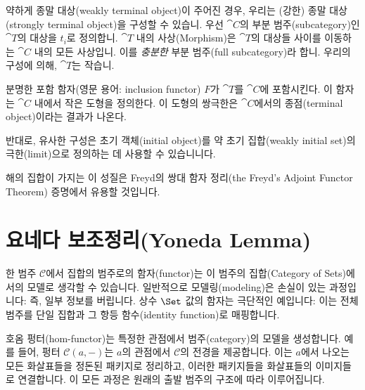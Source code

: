 \documentclass[DaoFP]{subfiles}
\begin{document}
약하게 종말 대상(weakly terminal object)이 주어진 경우, 우리는 (강한) 종말 대상(strongly terminal object)을 구성할 수 있습니. 우선 $\cat C$의 부분 범주(subcategory)인 $\cat T$의 대상을 $t_i$로 정의합니. $\cat T$ 내의 사상(Morphism)은 $\cat T$의 대상들 사이를 이동하는 $\cat C$ 내의 모든 사상입니. 이를 \emph{충분한} 부분 범주(full subcategory)라 합니. 우리의 구성에 의해, $\cat T$는 작습니.

분명한 포함 함자(영문 용어: inclusion functor) $F$가 $\cat T$를 $\cat C$에 포함시킨다. 이 함자는 $\cat C$ 내에서 작은 도형을 정의한다. 이 도형의 쌍극한은 $\cat C$에서의 종점(terminal object)이라는 결과가 나온다.

반대로, 유사한 구성은 초기 객체(initial object)를 약 초기 집합(weakly initial set)의 극한(limit)으로 정의하는 데 사용할 수 있습니니다.

해의 집합이 가지는 이 성질은 Freyd의 쌍대 함자 정리(the Freyd's Adjoint Functor Theorem) 증명에서 유용할 것입니다.

\section{요네다 보조정리(Yoneda Lemma)}

한 범주 $\mathcal{C}$에서 집합의 범주로의 함자(functor)는 이 범주의 집합(Category of Sets)에서의 모델로 생각할 수 있습니다. 일반적으로 모델링(modeling)은 손실이 있는 과정입니다: 즉, 일부 정보를 버립니다. 상수 $\Set$ 값의 함자는 극단적인 예입니다: 이는 전체 범주를 단일 집합과 그 항등 함수(identity function)로 매핑합니다.

호옴 펑터(hom-functor)는 특정한 관점에서 범주(category)의 모델을 생성합니다. 예를 들어, 펑터 $\mathcal{C}(a, -)$는 $a$의 관점에서 $\mathcal{C}$의 전경을 제공합니다. 이는 $a$에서 나오는 모든 화살표들을 정돈된 패키지로 정리하고, 이러한 패키지들을 화살표들의 이미지들로 연결합니다. 이 모든 과정은 원래의 출발 범주의 구조에 따라 이루어집니다.
\end{document}
